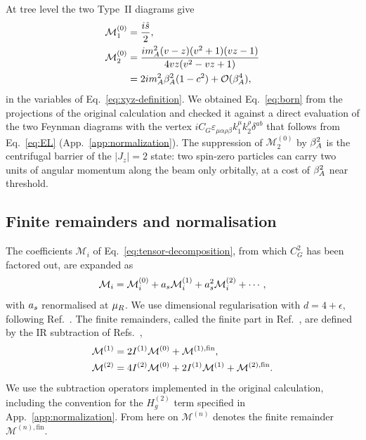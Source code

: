 At tree level the two Type~II diagrams give
\begin{align}
 \mathcal M_1^{(0)}&=\frac{i\hat s}{2},
 \nonumber\\
 \mathcal M_2^{(0)}&=\frac{im_A^2(v-z)(v^2+1)(vz-1)}{4vz(v^2-vz+1)}
 \nonumber\\
 &=2im_A^2\beta_A^2(1-c^2)+\mathcal{O}(\beta_A^4),
 \label{eq:born}
\end{align}
in the variables of Eq.~\eqref{eq:xyz-definition}. We obtained Eq.~\eqref{eq:born} from the projections of the original calculation and checked it against a direct evaluation of the two Feynman diagrams with the vertex $iC_G\varepsilon_{\mu\alpha\rho\beta}k_1^\mu k_2^\rho\delta^{ab}$ that follows from Eq.~\eqref{eq:EL} (App.~\ref{app:normalization}).
The suppression of $\mathcal M_2^{(0)}$ by $\beta_A^2$ is the centrifugal
barrier of the $|J_z|=2$ state: two spin-zero particles can carry two units
of angular momentum along the beam only orbitally, at a cost of $\beta_A^2$
near threshold.


\subsection{Finite remainders and normalisation}
\label{sec:normalization}

The coefficients $\mathcal M_i$ of Eq.~\eqref{eq:tensor-decomposition}, from which $C_G^2$ has been factored out, are expanded as
\begin{equation}
 \mathcal{M}_i
 =\mathcal{M}^{(0)}_i
 +a_s\mathcal{M}^{(1)}_i
 +a_s^2\mathcal{M}^{(2)}_i+\cdots,
 \label{eq:perturbative-expansion}
\end{equation}
with $a_s$ renormalised at $\mu_R$.
We use dimensional regularisation with $d=4+\epsilon$, following Ref.~\cite{Bhattacharya:2019bmd}. The finite remainders, called the finite part in Ref.~\cite{Bhattacharya:2019bmd}, are defined by the IR subtraction of Refs.~\cite{Bhattacharya:2019bmd,Catani:1998bh},
\begin{align}
 \mathcal M^{(1)}&=2I^{(1)}\mathcal M^{(0)}+\mathcal M^{(1),\mathrm{fin}},
 \nonumber\\
 \mathcal M^{(2)}&=4I^{(2)}\mathcal M^{(0)}+2I^{(1)}\mathcal M^{(1)}+\mathcal M^{(2),\mathrm{fin}}.
 \label{eq:catani}
\end{align}
We use the subtraction operators implemented in the original calculation, including the convention for the $H_g^{(2)}$ term specified in App.\ \ref{app:normalization}.
From here on $\mathcal{M}^{(n)}$ denotes the finite remainder
$\mathcal{M}^{(n),\mathrm{fin}}$.

